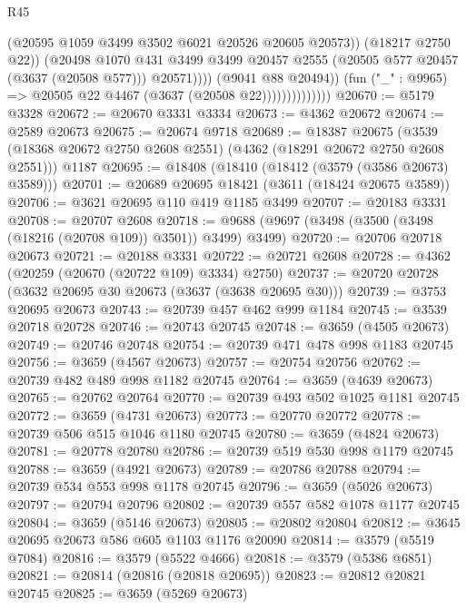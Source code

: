 \begin{lexlean}{R45}
\begin{coremodule}
                                      (@20595 @1059 @3499 @3502 @6021 @20526 @20605 @20573))
                                    (@18217 @2750 @22))
                                  (@20498
                                    @1070
                                    @431
                                    @3499
                                    @3499
                                    @20457
                                    @2555
                                    (@20505 @577 @20457 (@3637 (@20508 @577)))
                                    @20571))))
                            (@9041 @88 @20494))
                          (fun ("_" : @9965) => @20505 @22 @4467 (@3637 (@20508 @22))))))))))))))
@20670 := @5179 @3328
@20672 := @20670 @3331 @3334
@20673 := @4362 @20672
@20674 := @2589 @20673
@20675 := @20674 @9718
@20689 := @18387
    @20675
    (@3539 (@18368 @20672 @2750 @2608 @2551) (@4362 (@18291 @20672 @2750 @2608 @2551)))
    @1187
@20695 := @18408 (@18410 (@18412 (@3579 (@3586 @20673) @3589)))
@20701 := @20689 @20695 @18421 (@3611 (@18424 @20675 @3589))
@20706 := @3621 @20695 @110 @419 @1185 @3499
@20707 := @20183 @3331
@20708 := @20707 @2608
@20718 := @9688 (@9697 (@3498 (@3500 (@3498 (@18216 (@20708 @109)) @3501)) @3499) @3499)
@20720 := @20706 @20718 @20673
@20721 := @20188 @3331
@20722 := @20721 @2608
@20728 := @4362 (@20259 (@20670 (@20722 @109) @3334) @2750)
@20737 := @20720 @20728 (@3632 @20695 @30 @20673 (@3637 (@3638 @20695 @30)))
@20739 := @3753 @20695 @20673
@20743 := @20739 @457 @462 @999 @1184
@20745 := @3539 @20718 @20728
@20746 := @20743 @20745
@20748 := @3659 (@4505 @20673)
@20749 := @20746 @20748
@20754 := @20739 @471 @478 @998 @1183 @20745
@20756 := @3659 (@4567 @20673)
@20757 := @20754 @20756
@20762 := @20739 @482 @489 @998 @1182 @20745
@20764 := @3659 (@4639 @20673)
@20765 := @20762 @20764
@20770 := @20739 @493 @502 @1025 @1181 @20745
@20772 := @3659 (@4731 @20673)
@20773 := @20770 @20772
@20778 := @20739 @506 @515 @1046 @1180 @20745
@20780 := @3659 (@4824 @20673)
@20781 := @20778 @20780
@20786 := @20739 @519 @530 @998 @1179 @20745
@20788 := @3659 (@4921 @20673)
@20789 := @20786 @20788
@20794 := @20739 @534 @553 @998 @1178 @20745
@20796 := @3659 (@5026 @20673)
@20797 := @20794 @20796
@20802 := @20739 @557 @582 @1078 @1177 @20745
@20804 := @3659 (@5146 @20673)
@20805 := @20802 @20804
@20812 := @3645 @20695 @20673 @586 @605 @1103 @1176 @20090
@20814 := @3579 (@5519 @7084)
@20816 := @3579 (@5522 @4666)
@20818 := @3579 (@5386 @6851)
@20821 := @20814 (@20816 (@20818 @20695))
@20823 := @20812 @20821 @20745
@20825 := @3659 (@5269 @20673)

\end{coremodule}
\end{lexlean}
